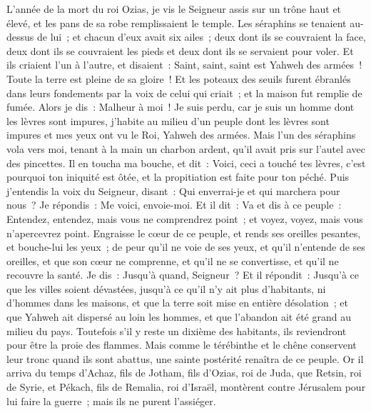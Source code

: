 \begin{multicols}{2}
\VerseOne{}L'année de la mort du roi Ozias, je vis le Seigneur assis sur un trône haut et élevé, et les pans de sa robe remplissaient le temple.
Les séraphins se tenaient au-dessus de lui~; et chacun d'eux avait six ailes~; deux dont ils se couvraient la face, deux dont ils se couvraient les pieds et deux dont ils se servaient pour voler.
Et ils criaient l'un à l'autre, et disaient~: Saint, saint, saint est Yahweh des armées~! Toute la terre est pleine de sa gloire~!
Et les poteaux des seuils furent ébranlés dans leurs fondements par la voix de celui qui criait~; et la maison fut remplie de fumée.
Alors je dis~: Malheur à moi~! Je suis perdu, car je suis un homme dont les lèvres sont impures, j'habite au milieu d'un peuple dont les lèvres sont impures et mes yeux ont vu le Roi, Yahweh des armées.
Mais l'un des séraphins vola vers moi, tenant à la main un charbon ardent, qu'il avait pris sur l'autel avec des pincettes.
Il en toucha ma bouche, et dit~: Voici, ceci a touché tes lèvres, c'est pourquoi ton iniquité est ôtée, et la propitiation est faite pour ton péché.
Puis j'entendis la voix du Seigneur, disant~: Qui enverrai-je et qui marchera pour nous~? Je répondis~: Me voici, envoie-moi.
Et il dit~: Va et dis à ce peuple~: Entendez, entendez, mais vous ne comprendrez point~; et voyez, voyez, mais vous n'apercevrez point.
Engraisse le cœur de ce peuple, et rends ses oreilles pesantes, et bouche-lui les yeux~; de peur qu'il ne voie de ses yeux, et qu'il n'entende de ses oreilles, et que son cœur ne comprenne, et qu'il ne se convertisse, et qu'il ne recouvre la santé.
Je dis~: Jusqu'à quand, Seigneur~? Et il répondit~: Jusqu'à ce que les villes soient dévastées, jusqu'à ce qu'il n'y ait plus d'habitants, ni d'hommes dans les maisons, et que la terre soit mise en entière désolation~;
 et que Yahweh ait dispersé au loin les hommes, et que l'abandon ait été grand au milieu du pays.
Toutefois s'il y reste un dixième des habitants, ils reviendront pour être la proie des flammes. Mais comme le térébinthe et le chêne conservent leur tronc quand ils sont abattus, une sainte postérité renaîtra de ce peuple.
\VerseOne{}Or il arriva du temps d'Achaz, fils de Jotham, fils d'Ozias, roi de Juda, que Retsin, roi de Syrie, et Pékach, fils de Remalia, roi d'Israël, montèrent contre Jérusalem pour lui faire la guerre~; mais ils ne purent l'assiéger.

\end{multicols}
